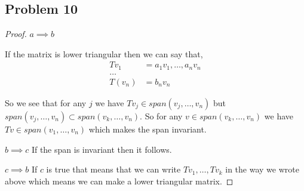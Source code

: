 \documentclass[a4paper]{report}
\begin{document}
\subsection*{Problem 10}
\begin{proof}
   $a \implies b$

   If the matrix is lower triangular then we can say that, 
   \begin{align*}
      Tv_1 &= a_1v_1,\dots, a_nv_n\\
      \dots\\
      T(v_n) &= b_nv_n
   \end{align*}

   So we see that for any $j$ we have  $Tv_j \in span(v_j,\dots,v_n)$ but $span(v_j,\dots,v_n) \subset span(v_k,\dots,v_n)$. So for any  $v \in span(v_k,\dots,v_n)$ we have $Tv \in span(v_1,\dots,v_n)$ which makes the span invariant.

   $b \implies c$
   If the span is invariant then it follows.

    $c \implies b$ 
    If $c$ is true that means that we can write $Tv_1,\dots,Tv_k$ in the way we wrote above which means we can make a lower triangular matrix.
\end{proof}
\end{document}
